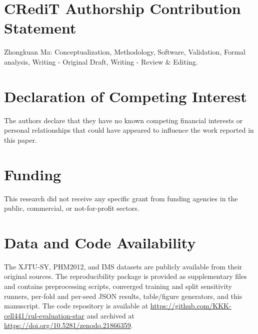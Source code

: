 \documentclass[5p,twocolumn]{elsarticle}
\begin{document}
\section*{CRediT Authorship Contribution Statement}
Zhongkuan Ma: Conceptualization, Methodology, Software, Validation, Formal analysis, Writing - Original Draft, Writing - Review \& Editing.

\section*{Declaration of Competing Interest}
The authors declare that they have no known competing financial interests or personal relationships that could have appeared to influence the work reported in this paper.

\section*{Funding}
This research did not receive any specific grant from funding agencies in the public, commercial, or not-for-profit sectors.

\section*{Data and Code Availability}
The XJTU-SY, PHM2012, and IMS datasets are publicly available from their original sources. The reproducibility package is provided as supplementary files and contains preprocessing scripts, converged training and split sensitivity runners, per-fold and per-seed JSON results, table/figure generators, and this manuscript. The code repository is available at \url{https://github.com/KKK-cell441/rul-evaluation-star} and archived at \url{https://doi.org/10.5281/zenodo.21866359}.


\end{document}
